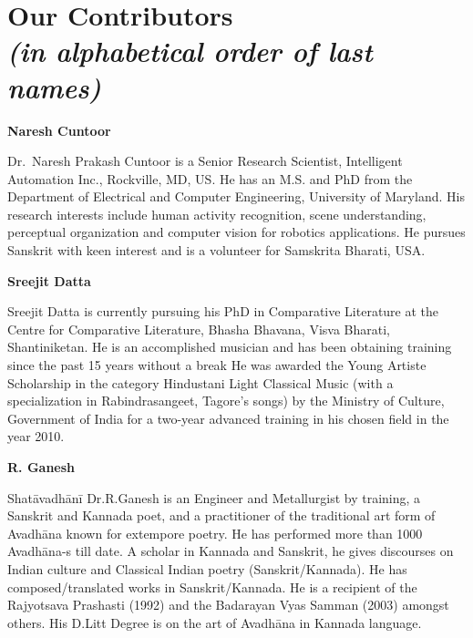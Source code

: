 \makeatletter
\def\@makeschapterhead#1{%
  \vspace*{50\p@}%
  {\parindent \z@ \raggedleft
    \normalfont
    \interlinepenalty\@M
    \LARGE \bfseries  #1\par\nobreak
    \vskip 20\p@
  }}
\makeatother

\chapter*{Our Contributors\\ {\rm\sl\small (in alphabetical order of last names)}}\label{contributors}


\chead[]{}
\cfoot[]{}

\hfill {\large\bf Naresh Cuntoor}
\medskip

Dr.~Naresh Prakash Cuntoor is a Senior Research Scientist, Intelligent Automation Inc.,
Rockville, MD, US. He has an M.S. and PhD from the Department of Electrical and
Computer Engineering, University of Maryland. His research interests include human
activity recognition, scene understanding, perceptual organization and computer vision for
robotics applications. He pursues Sanskrit with keen interest and is a volunteer for
Samskrita Bharati, USA.

\bigskip
\hfill {\large\bf Sreejit Datta}
\medskip

Sreejit Datta is currently pursuing his PhD in Comparative Literature at the Centre
for Comparative Literature, Bhasha Bhavana, Visva Bharati, Shantiniketan. He is
an accomplished musician and has been obtaining training since the past 15 years
without a break He was awarded the Young Artiste Scholarship in the category
Hindustani Light Classical Music (with a specialization in Rabindrasangeet,
Tagore's songs) by the Ministry of Culture, Government of India for a two-year
advanced training in his chosen field in the year 2010.

\bigskip
\hfill {\large\bf R. Ganesh}
\medskip

Shatāvadhānī Dr.\@ R.\@ Ganesh is an Engineer and Metallurgist by training, a Sanskrit and Kannada poet, and a practitioner of the traditional art form of Avadhāna known for extempore poetry. He has performed more than 1000 Avadhāna-s till date. A scholar in Kannada and Sanskrit, he gives discourses on Indian culture and Classical Indian poetry (Sanskrit/Kannada). He has composed/translated works in Sanskrit/Kannada. He is a recipient of the Rajyotsava Prashasti (1992) and the Badarayan Vyas Samman (2003) amongst others. His D.Litt Degree is on the art of
Avadhāna in Kannada language.

